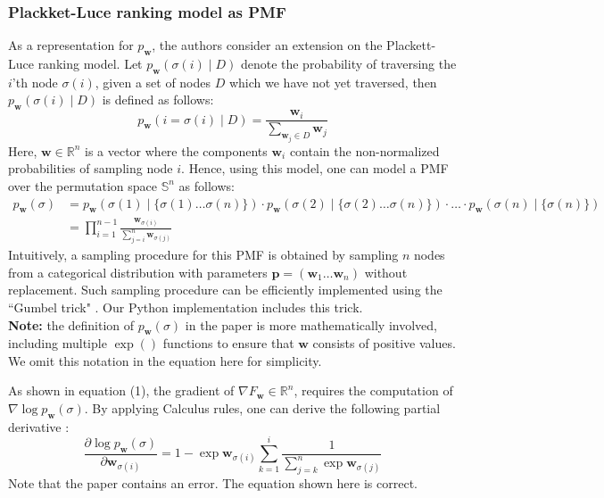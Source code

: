 \documentclass[a4paper,10pt]{article}
\begin{document}
	\subsubsection{Plackket-Luce ranking model as PMF} \label{cha:pmf_indep}
	As a representation for $p_\mathbf{w}$, the authors consider an extension on the Plackett-Luce ranking model. Let $p_\mathbf{w}\left(\sigma(i) \mid D\right)$ denote the probability of traversing the $i$'th node $\sigma(i)$, given a set of nodes $D$ which we have not yet traversed, then $p_\mathbf{w}\left(\sigma(i) \mid D\right)$ is defined as follows:
	$$
		p_\mathbf{w}\left(i=\sigma(i) \mid D\right)=\frac{\mathbf{w}_i}{\sum_{\mathbf{w}_j \in D} \mathbf{w}_j}
	$$
	Here, $\mathbf{w} \in \mathbb{R}^n$ is a vector where the components $\mathbf{w}_i$ contain the non-normalized probabilities of sampling node $i$. Hence, using this model, one can model a PMF over the permutation space $\mathbb{S}^n$ as follows:	
	\begin{align}
		p_\mathbf{w}(\sigma) &= p_\mathbf{w}\left(\sigma(1) \mid \{ \sigma(1) \dots \sigma(n) \}\right) \cdot p_\mathbf{w}\left(\sigma(2) \mid \{ \sigma(2) \dots \sigma(n) \} \right) \cdot \ldots \cdot p_\mathbf{w}\left(\sigma(n) \mid \{ \sigma(n) \} \right) \\
		&=\prod_{i=1}^{n-1} \frac{\mathbf{w}_{\sigma(i)}}{\sum_{j=i}^n \mathbf{w}_{\sigma(j)}}
	\end{align}
	Intuitively, a sampling procedure for this PMF is obtained by sampling $n$ nodes from a categorical distribution with parameters $\mathbf{p} = (\mathbf{w}_1 \dots \mathbf{w}_n)$ without replacement. Such sampling procedure can be efficiently implemented using the ``Gumbel trick" \cite{kool_stochastic_2019}. Our Python implementation includes this trick. \\
	\textbf{Note:} the definition of $p_\mathbf{w}(\sigma)$ in the paper is more mathematically involved, including multiple $\exp()$ functions to ensure that $\mathbf{w}$ consists of positive values. We omit this notation in the equation here for simplicity.

	As shown in equation (1), the gradient of $\nabla F_\mathbf{w} \in \mathbb{R}^n$, requires the computation of $\nabla \log p_\mathbf{w}(\sigma)$. By applying Calculus rules, one can derive the following partial derivative \citep{santucci_gradient_2020}:
	$$
	\frac{\partial \log p_\mathbf{w}(\sigma)}{\partial \mathbf{w}_{\sigma(i)}}=1-\exp \mathbf{w}_{\sigma(i)} \sum_{k=1}^i \frac{1}{\sum_{j=k}^n \exp \mathbf{w}_{\sigma(j)}}
	$$
	Note that the paper contains an error. The equation shown here is correct.
	
\end{document}
